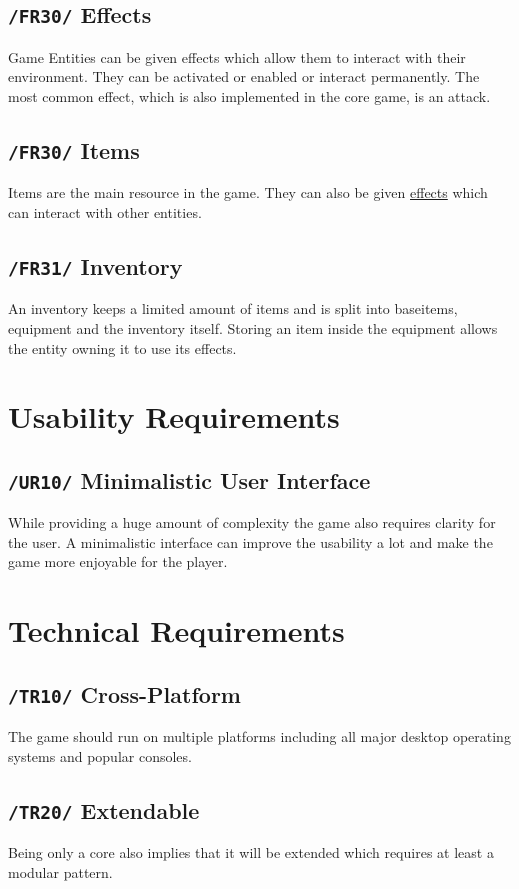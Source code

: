 \documentclass[11pt]{article}
\begin{document}
\subsection{\texttt{/FR30/} Effects}\label{subsec:fr30effects}
Game Entities can be given effects which allow them to interact with their environment.
They can be activated or enabled or interact permanently.
The most common effect, which is also implemented in the core game, is an attack.
\subsection{\texttt{/FR30/} Items}\label{subsec:fr40items}
Items are the main resource in the game. They can also be given \hyperref[subsec:fr30effects]{effects} which can interact with other entities.
\subsection{\texttt{/FR31/} Inventory}\label{subsec:fr41inventory}
An inventory keeps a limited amount of items and is split into baseitems, equipment and the inventory itself.
Storing an item inside the equipment allows the entity owning it to use its effects.

\section{Usability Requirements}\label{sec:ur}
\subsection{\texttt{/UR10/} Minimalistic User Interface}
While providing a huge amount of complexity the game also requires clarity for the user. A minimalistic interface can improve the usability a lot and make the game more enjoyable for the player.

\section{Technical Requirements}\label{sec:tr}
\subsection{\texttt{/TR10/} Cross-Platform}
The game should run on multiple platforms including all major desktop operating systems and popular consoles.
\subsection{\texttt{/TR20/} Extendable}
Being only a core also implies that it will be extended which requires at least a modular pattern.
\end{document}
